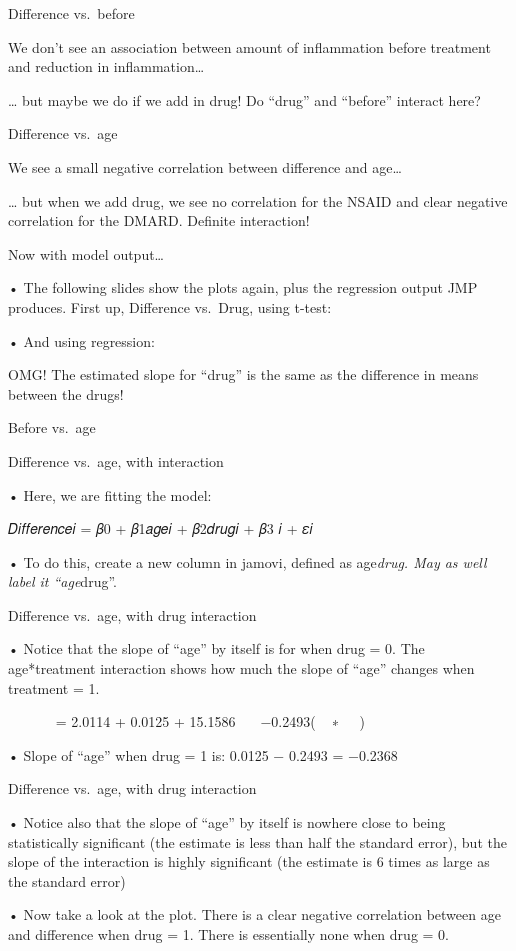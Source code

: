 \documentclass[
  letterpaper,
  DIV=11,
  numbers=noendperiod]{scrreprt}
\begin{document}
Difference vs.~before

We don't see an association between amount of inflammation before
treatment and reduction in inflammation\ldots{}

\ldots{} but maybe we do if we add in drug! Do ``drug'' and ``before''
interact here?

Difference vs.~age

We see a small negative correlation between difference and age\ldots{}

\ldots{} but when we add drug, we see no correlation for the NSAID and
clear negative correlation for the DMARD. Definite interaction!

Now with model output\ldots{}

• The following slides show the plots again, plus the regression output
JMP produces. First up, Difference vs.~Drug, using t-test:

• And using regression:

OMG! The estimated slope for ``drug'' is the same as the difference in
means between the drugs!

Before vs.~age

Difference vs.~age, with interaction

• Here, we are fitting the model:

𝐷𝑖𝑓𝑓𝑒𝑟𝑒𝑛𝑐𝑒𝑖 = 𝛽0 + 𝛽1𝑎𝑔𝑒𝑖 + 𝛽2𝑑𝑟𝑢𝑔𝑖 + 𝛽3 𝑖 + 𝜀𝑖

• To do this, create a new column in jamovi, defined as age\emph{drug.
May as well label it ``age}drug''.

Difference vs.~age, with drug interaction

• Notice that the slope of ``age'' by itself is for when drug = 0. The
age*treatment interaction shows how much the slope of ``age'' changes
when treatment = 1.

𝑑𝑖𝑓𝑓෣𝑒𝑟𝑒𝑛𝑐𝑒 = 2.0114 + 0.0125 + 15.1586 𝑑𝑟𝑢𝑔 −0.2493(𝑎𝑔𝑒 ∗ 𝑑𝑟𝑢𝑔)

• Slope of ``age'' when drug = 1 is: 0.0125 − 0.2493 = −0.2368

Difference vs.~age, with drug interaction

• Notice also that the slope of ``age'' by itself is nowhere close to
being statistically significant (the estimate is less than half the
standard error), but the slope of the interaction is highly significant
(the estimate is 6 times as large as the standard error)

• Now take a look at the plot. There is a clear negative correlation
between age and difference when drug = 1. There is essentially none when
drug = 0.
\end{document}
